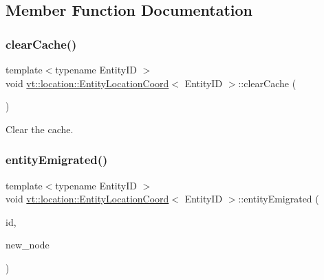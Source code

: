 \subsection{Member Function Documentation}
\mbox{\label{structvt_1_1location_1_1_entity_location_coord_ac20c510b73a5f6f753269b6d05b389aa}} 
\subsubsection{\texorpdfstring{clear\+Cache()}{clearCache()}}
{\footnotesize\ttfamily template$<$typename Entity\+ID $>$ \\
void \hyperlink{structvt_1_1location_1_1_entity_location_coord}{vt\+::location\+::\+Entity\+Location\+Coord}$<$ Entity\+ID $>$\+::clear\+Cache (\begin{DoxyParamCaption}{ }\end{DoxyParamCaption})}



Clear the cache. 

\mbox{\label{structvt_1_1location_1_1_entity_location_coord_a770fca228907ff6f818ab184d7580a5e}} 
\subsubsection{\texorpdfstring{entity\+Emigrated()}{entityEmigrated()}}
{\footnotesize\ttfamily template$<$typename Entity\+ID $>$ \\
void \hyperlink{structvt_1_1location_1_1_entity_location_coord}{vt\+::location\+::\+Entity\+Location\+Coord}$<$ Entity\+ID $>$\+::entity\+Emigrated (\begin{DoxyParamCaption}\item[{Entity\+ID const \&}]{id,  }\item[{\hyperlink{namespacevt_a866da9d0efc19c0a1ce79e9e492f47e2}{Node\+Type} const \&}]{new\+\_\+node }\end{DoxyParamCaption})}



